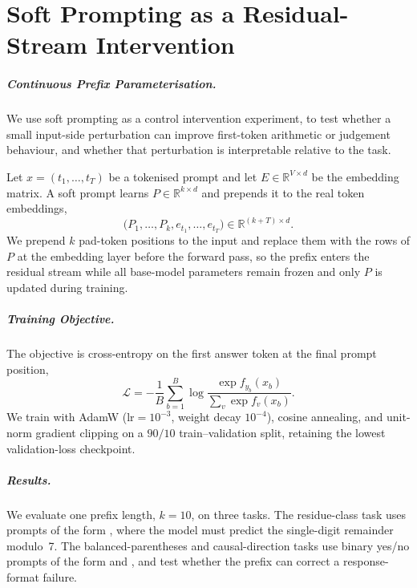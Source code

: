 \chapter{Soft Prompting as a Residual-Stream Intervention}
\label{sec:k_e}

\paragraph{Continuous Prefix Parameterisation.}
We use soft prompting as a control intervention experiment, to test whether a small 
input-side perturbation can improve first-token arithmetic or judgement behaviour,
 and whether that perturbation is interpretable relative to the task. 

Let $x=(t_1,\ldots,t_T)$ be a tokenised prompt and let $E\in\mathbb{R}^{V\times d}$ 
be the embedding matrix. A soft prompt learns $P\in\mathbb{R}^{k\times d}$ and 
prepends it to the real token embeddings,
\begin{equation}
\bigl(P_1,\ldots,P_k,e_{t_1},\ldots,e_{t_T}\bigr)
\in \mathbb{R}^{(k+T)\times d}.
\label{eq:soft_prompt_seq}
\end{equation}
We prepend $k$ pad-token positions to the input and replace them with the rows of $P$
at the embedding layer before the forward pass, so the prefix enters the residual
stream while all base-model parameters remain frozen and only $P$ is updated during training.

\paragraph{Training Objective.}

The objective is cross-entropy on the first answer token at the final prompt position,
\begin{equation}
\mathcal{L}
=
-\frac{1}{B}\sum_{b=1}^{B}
\log
\frac{\exp f_{y_b}(x_b)}
     {\sum_v \exp f_v(x_b)}.
\label{eq:soft_prompt_loss}
\end{equation}
We train with AdamW ($\mathrm{lr}=10^{-3}$, weight decay $10^{-4}$), 
cosine annealing, and unit-norm gradient clipping on a $90/10$ train--validation
 split, retaining the lowest validation-loss checkpoint.

\paragraph{Results.}

We evaluate one prefix length, $k=10$, on three tasks. The residue-class task uses prompts of the form , where the model must predict the single-digit remainder modulo~7. The balanced-parentheses and causal-direction tasks use binary yes/no prompts of the form  and , and test whether the prefix can correct a response-format failure.

